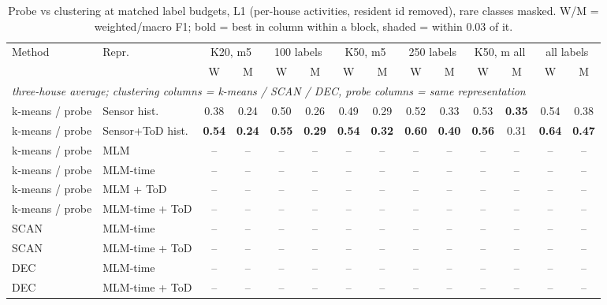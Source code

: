 \begin{table}[H]
\centering\small
\caption{Probe vs clustering at matched label budgets, L1 (per-house activities, resident id removed), rare classes masked. W/M = weighted/macro F1; bold = best in column within a block, shaded = within 0.03 of it.}
\label{tab:cmp_l1_masked}
\setlength{\tabcolsep}{3.5pt}
\begin{tabular}{llcc|cc|cc|cc|cc|cc}
\toprule
Method & Repr. & \multicolumn{2}{c}{K20, m5} & \multicolumn{2}{c}{100 labels} & \multicolumn{2}{c}{K50, m5} & \multicolumn{2}{c}{250 labels} & \multicolumn{2}{c}{K50, m all} & \multicolumn{2}{c}{all labels} \\
\cmidrule(lr){3-4}\cmidrule(lr){5-6}\cmidrule(lr){7-8}\cmidrule(lr){9-10}\cmidrule(lr){11-12}\cmidrule(lr){13-14}
 & & W & M & W & M & W & M & W & M & W & M & W & M \\
\midrule
\multicolumn{14}{l}{\textit{three-house average; clustering columns = k-means / SCAN / DEC, probe columns = same representation}} \\
\midrule
k-means / probe & Sensor hist. & 0.38 & \cellcolor{blue!12}0.24 & 0.50 & \cellcolor{blue!12}0.26 & 0.49 & \cellcolor{blue!12}0.29 & 0.52 & 0.33 & \cellcolor{blue!12}0.53 & \cellcolor{blue!12}\textbf{0.35} & 0.54 & 0.38 \\
k-means / probe & Sensor+ToD hist. & \cellcolor{blue!12}\textbf{0.54} & \cellcolor{blue!12}\textbf{0.24} & \cellcolor{blue!12}\textbf{0.55} & \cellcolor{blue!12}\textbf{0.29} & \cellcolor{blue!12}\textbf{0.54} & \cellcolor{blue!12}\textbf{0.32} & \cellcolor{blue!12}\textbf{0.60} & \cellcolor{blue!12}\textbf{0.40} & \cellcolor{blue!12}\textbf{0.56} & 0.31 & \cellcolor{blue!12}\textbf{0.64} & \cellcolor{blue!12}\textbf{0.47} \\
\cmidrule{1-14}
k-means / probe & MLM & -- & -- & -- & -- & -- & -- & -- & -- & -- & -- & -- & -- \\
k-means / probe & MLM-time & -- & -- & -- & -- & -- & -- & -- & -- & -- & -- & -- & -- \\
k-means / probe & MLM + ToD & -- & -- & -- & -- & -- & -- & -- & -- & -- & -- & -- & -- \\
k-means / probe & MLM-time + ToD & -- & -- & -- & -- & -- & -- & -- & -- & -- & -- & -- & -- \\
\cmidrule{1-14}
SCAN & MLM-time & -- & -- & -- & -- & -- & -- & -- & -- & -- & -- & -- & -- \\
SCAN & MLM-time + ToD & -- & -- & -- & -- & -- & -- & -- & -- & -- & -- & -- & -- \\
\cmidrule{1-14}
DEC & MLM-time & -- & -- & -- & -- & -- & -- & -- & -- & -- & -- & -- & -- \\
DEC & MLM-time + ToD & -- & -- & -- & -- & -- & -- & -- & -- & -- & -- & -- & -- \\
\bottomrule
\end{tabular}
\end{table}

